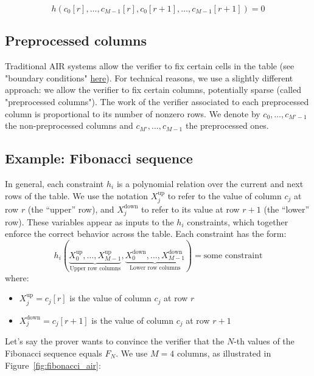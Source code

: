 \documentclass{article}
\begin{document}
$$h(c_0[r], \dots, c_{M-1}[r], c_0[r+1], \dots, c_{M-1}[r+1]) = 0$$

\subsection{Preprocessed columns}

Traditional AIR systems allow the verifier to fix certain cells in the table (see "boundary conditions" \href{https://aszepieniec.github.io/stark-anatomy/stark}{here}). For technical reasons, we use a slightly different approach: we allow the verifier to fix certain columns, potentially sparse (called "preprocessed columns"). The work of the verifier associated to each preprocessed column is proportional to its number of nonzero rows. We denote by $c_0, \dots, c_{M'-1}$ the non-preprocessed columns and $c_{M'}, \dots, c_{M-1}$ the preprocessed ones.

\subsection{Example: Fibonacci sequence}


In general, each constraint $h_i$ is a polynomial relation over the current and next rows of the table. We use the notation $X_j^{\text{up}}$ to refer to the value of column $c_j$ at row $r$ (the “upper” row), and $X_j^{\text{down}}$ to refer to its value at row $r + 1$ (the “lower” row). These variables appear as inputs to the $h_i$ constraints, which together enforce the correct behavior across the table. Each constraint has the form:
$$
h_i(\underbrace{X_0^{\text{up}}, \dots, X_{M-1}^{\text{up}}}_{\text{Upper row columns}}, \underbrace{X_0^{\text{down}}, \dots, X_{M-1}^{\text{down}}}_{\text{Lower row columns}}) = \text{some constraint}
$$
where:
\begin{itemize}
    \item $X_j^{\text{up}} = c_j[r]$ is the value of column $c_j$ at row $r$
    \item $X_j^{\text{down}} = c_j[r + 1]$ is the value of column $c_j$ at row $r + 1$
\end{itemize}

Let's say the prover wants to convince the verifier that the $N$-th values of the Fibonacci sequence equals $F_N$. We use $M = 4$ columns, as illustrated in Figure~\ref{fig:fibonacci_air}:
\end{document}
